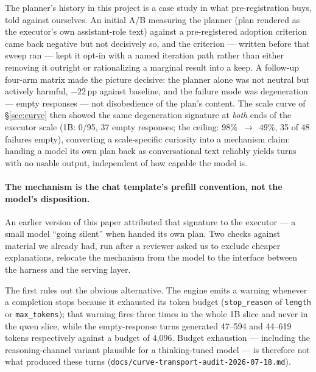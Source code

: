 \documentclass[smallcondensed,natbib]{svjour3}
\begin{document}
The planner's history in this project is a case study in what
pre-registration buys, told against ourselves. An initial A/B measuring
the planner (plan rendered as the executor's own assistant-role text)
against a pre-registered adoption criterion came back negative but not
decisively so, and the criterion --- written before that sweep ran ---
kept it opt-in with a named iteration path rather than either removing
it outright or rationalizing a marginal result into a keep. A follow-up
four-arm matrix made the picture decisive: the planner alone was not
neutral but actively harmful, $-22$\,pp against baseline, and the
failure mode was degeneration --- empty responses --- not disobedience of
the plan's content. The scale curve of \S\ref{sec:curve} then showed the
same degeneration signature at \emph{both} ends of the executor scale
(1B: 0/95, 37 empty responses; the ceiling: 98\%~$\to$~49\%, 35 of 48
failures empty), converting a scale-specific curiosity into a mechanism
claim: handing a model its own plan back as conversational text
reliably yields turns with no usable output, independent of how
capable the model is.

\paragraph{The mechanism is the chat template's prefill convention, not
the model's disposition.} An earlier version of this paper attributed
that signature to the executor --- a small model ``going silent'' when
handed its own plan. Two checks against material we already had, run
after a reviewer asked us to exclude cheaper explanations, relocate the
mechanism from the model to the interface between the harness and the
serving layer.

The first rules out the obvious alternative. The engine emits a warning
whenever a completion stops because it exhausted its token budget
(\texttt{stop\_reason} of \texttt{length} or \texttt{max\_tokens}); that
warning fires three times in the whole 1B slice and never in the qwen
slice, while the empty-response turns generated 47--594 and 44--619
tokens respectively against a budget of 4{,}096. Budget exhaustion ---
including the reasoning-channel variant plausible for a thinking-tuned
model --- is therefore not what produced these turns
(\texttt{docs/curve-transport-audit-2026-07-18.md}).
\end{document}
